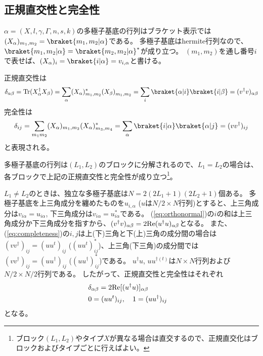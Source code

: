 \documentclass[11pt]{easymemo}
\begin{document}
\subsection{正規直交性と完全性}

$\alpha=(X,l,\gamma,\Gamma,n,s,k)$の多極子基底の行列はブラケット表示では$(X_{\alpha})_{m_{1},m_{2}}=\braket{m_{1},m_{2}|\alpha}$である。
多極子基底はhermite行列なので、$\braket{m_{1},m_{2}|\alpha}=\braket{m_{2},m_{2}|\alpha}^{*}$が成り立つ。
$(m_{1},m_{2})$を通し番号$i$で表せば、$(X_{\alpha})_{i}=\braket{i|\alpha}=v_{i,\alpha}$と書ける。

正規直交性は
\begin{align}
\delta_{\alpha\beta}={\rm Tr}(X_{\alpha}^{\dagger }X_{\beta})
=\sum_{\alpha}(X_{\alpha})_{m_{1},m_{2}}^{*}(X_{\beta})_{m_{1},m_{2}}^{}=\sum_{i}\braket{\alpha|i}\braket{i|\beta}=(v^{\dagger}v)_{\alpha\beta}
\label{eq:orthonormal}
\end{align}
完全性は
\begin{align}
\delta_{ij}
=\sum_{m_{1}m_{2}}(X_{\alpha})_{m_{1},m_{2}}(X_{\alpha})_{m_{3},m_{4}}^{*}=\sum_{\alpha}\braket{i|\alpha}\braket{\alpha|j}
=(vv^{\dagger})_{ij}
\label{eq:completeness}
\end{align}
と表現される。

多極子基底の行列は$(L_{1},L_{2})$のブロックに分解されるので、$L_{1}=L_{2}$の場合は、各ブロックで上記の正規直交性と完全性が成り立つ\footnote{ブロック$(L_{1},L_{2})$やタイプ$X$が異なる場合は直交するので、正規直交化はブロックおよびタイプごとに行えばよい。}。

$L_{1}\ne L_{2}$のときは、独立な多極子基底は$N=2(2L_{1}+1)(2L_{2}+1)$個ある。
多極子基底を上三角成分を纏めたものを$u_{i,\alpha}$ ($u$は$N/2\times N$行列)とすると、上三角成分は$v_{i\alpha}=u_{i\alpha}$, 下三角成分は$v_{i\alpha}=u_{i\alpha}^{*}$である。
(\ref{eq:orthonormal})の$i$の和は上三角成分か下三角成分を指すから、$(v^{\dagger}v)_{\alpha\beta}=2{\rm Re}(u^{\dagger}u)_{\alpha\beta}$となる。
また、(\ref{eq:completeness})の$i,j$は上(下)三角と下(上)三角の成分間の場合は$(vv^{\dagger})_{ij}=(u u^{t})_{ij}$ ($(u u^{t})_{ij}^{*}$)、上三角(下三角)の成分間では$(vv^{\dagger})_{ij}=(uu^{\dagger})_{ij}$ ($(uu^{\dagger})_{ij}^{*}$)である。
$u^{\dagger}u$, $uu^{\dagger(t)}$は$N\times N$行列および$N/2\times N/2$行列である。
したがって、正規直交性と完全性はそれぞれ
\begin{align}
&
\delta_{\alpha\beta}=2{\rm Re}[(u^{\dagger}u)]_{\alpha\beta}
\cr&
0
=(uu^{t})_{ij},
\quad
1=(uu^{\dagger})_{ij}
\end{align}
となる。
\end{document}
